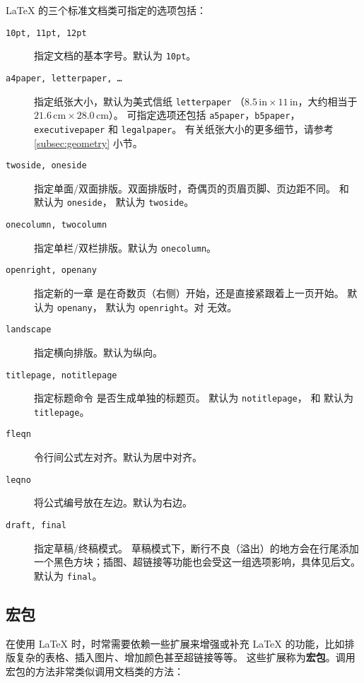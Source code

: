 \LaTeX{} 的三个标准文档类可指定的选项包括：
\begin{description}
\item[\texttt{10pt, 11pt, 12pt}] \quad 指定文档的基本字号。默认为 \texttt{10pt}。
\item[\texttt{a4paper, letterpaper, \ldots}] \quad 指定纸张大小，默认为美式信纸 \texttt{letterpaper}
（$8.5\,\text{in}\times11\,\text{in}$，大约相当于 $21.6\,\text{cm}\times28.0\,\text{cm}$）。
可指定选项还包括 \texttt{a5paper}，\texttt{b5paper}，\texttt{executivepaper} 和 \texttt{legalpaper}。
有关纸张大小的更多细节，请参考 \ref{subsec:geometry} 小节。
\item[\texttt{twoside, oneside}] \quad 指定单面/双面排版。双面排版时，奇偶页的页眉页脚、页边距不同。
 和  默认为 \texttt{oneside}， 默认为 \texttt{twoside}。
\item[\texttt{onecolumn, twocolumn}] \quad 指定单栏/双栏排版。默认为 \texttt{onecolumn}。
\item[\texttt{openright, openany}] \quad 指定新的一章  是在奇数页（右侧）开始，还是直接紧跟着上一页开始。
 默认为 \texttt{openany}， 默认为 \texttt{openright}。对  无效。
\item[\texttt{landscape}] \quad 指定横向排版。默认为纵向。
\item[\texttt{titlepage, notitlepage}] 指定标题命令  是否生成单独的标题页。
 默认为 \texttt{notitlepage}， 和  默认为 \texttt{titlepage}。
\item[\texttt{fleqn}] \quad 令行间公式左对齐。默认为居中对齐。
\item[\texttt{leqno}] \quad 将公式编号放在左边。默认为右边。
\item[\texttt{draft, final}] \quad 指定草稿/终稿模式。
草稿模式下，断行不良（溢出）的地方会在行尾添加一个黑色方块；插图、超链接等功能也会受这一组选项影响，具体见后文。默认为 \texttt{final}。
\end{description}

\subsection{宏包}\label{subsec:packages}

在使用 \LaTeX{} 时，时常需要依赖一些扩展来增强或补充 \LaTeX{} 的功能，比如排版复杂的表格、插入图片、增加颜色甚至超链接等等。
这些扩展称为\textbf{宏包}。调用宏包的方法非常类似调用文档类的方法：
\begin{command}
\end{command}


